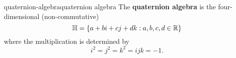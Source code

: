 


\begin{topic}{quaternion-algebra}{quaternion algebra}
    The \textbf{quaternion algebra} is the four-dimensional (non-commutative) 
    \[ \mathbb{H} = \{ a + bi + cj + dk : a, b, c, d \in \mathbb{R} \} \]
    where the multiplication is determined by
    \[ i^2 = j^2 = k^2 = ijk = -1 . \]
\end{topic}


